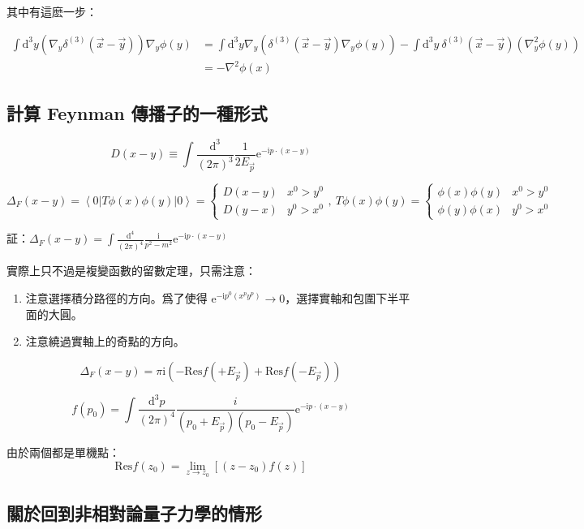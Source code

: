 \documentclass{article}
\begin{document}
其中有這麽一步：

$$
\begin{aligned}
\int\mathrm{d}^3y\left(\nabla_y\delta^{(3)}(\vec{x}-\vec{y})\right)\nabla_y\phi(y) & =\int\mathrm{d}^3y\nabla_y\left(\delta^{(3)}(\vec{x}-\vec{y})\nabla_y\phi(y)\right)-\int\mathrm{d}^3y\ \delta^{(3)}(\vec{x}-\vec{y})\left(\nabla_y^2\phi(y)\right) \\
& =-\nabla^2\phi(x)
\end{aligned}$$

\subsection{計算 Feynman 傳播子的一種形式}

$$D(x-y)\equiv\int\frac{\mathrm{d}^3}{(2\pi)^3}\frac{1}{2E_{\vec{p}}}\mathrm{e}^{-\mathrm{i}p\cdot(x-y)}$$

$$\Delta_F(x-y)=\left\langle0\right|T\phi(x)\phi(y)\left|0\right\rangle=
\begin{cases}
D(x-y) & x^0>y^0 \\
D(y-x) & y^0>x^0
\end{cases},\ T\phi(x)\phi(y)=
\begin{cases}
\phi(x)\phi(y) & x^0>y^0 \\
\phi(y)\phi(x) & y^0>x^0
\end{cases}$$

証：$\Delta_F(x-y)=\int\frac{\mathrm{d}^4}{(2\pi)^4}\frac{\mathrm{i}}{p^2-m^2}\mathrm{e}^{-\mathrm{i}p\cdot(x-y)}$

實際上只不過是複變函數的留數定理，只需注意：
\begin{enumerate}
\item 注意選擇積分路徑的方向。爲了使得 $\mathrm{e}^{-\mathrm{i}p^0(x^py^p)}\to 0$，選擇實軸和包圍下半平面的大圓。
\item 注意繞過實軸上的奇點的方向。
\end{enumerate}

$$\Delta_F(x-y)=\pi\mathrm{i}\left(-\mathrm{Res}f(+E_{\vec{p}})+\mathrm{Res}f(-E_{\vec{p}})\right)$$

$$f(p_0)=\int\frac{\mathrm{d}^3p}{(2\pi)^4}\frac{i}{(p_0+E_{\vec{p}})(p_0-E_{\vec{p}})}\mathrm{e}^{-\mathrm{i}p\cdot(x-y)}$$

由於兩個都是單機點：$$\mathrm{Res}f(z_0)=\lim_{z\to z_0}[(z-z_0)f(z)]$$

\subsection{關於回到非相對論量子力學的情形}
\end{document}
